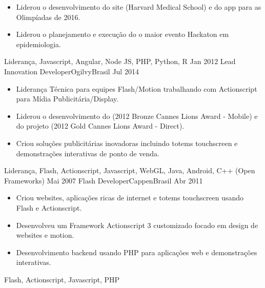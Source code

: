 \begin{experiences}
{\begin{itemize}
                        \item Liderou o desenvolvimento do site  (Harvard Medical School) e do app  para as Olimpíadas de 2016.
                        \item Liderou o planejamento e execução do  o maior evento Hackaton em epidemiologia.
                      \end{itemize}
                    }
                    {Liderança, Javascript, Angular, Node JS, PHP, Python, R}
  \emptySeparator
  \experience
    {Jan 2012}     {Lead Innovation Developer}{Ogilvy}{Brasil}
    {Jul 2014}    {
                      \begin{itemize}
                        \item Liderança Técnica para equipes Flash/Motion trabalhando com Actionscript para Mídia Publicitária/Display.
                        \item Liderou o desenvolvimento do  (2012 Bronze Cannes Lions Award - Mobile) e do projeto  (2012 Gold Cannes Lions Award - Direct).
                        \item Criou soluções publicitárias inovadoras incluindo totems touchscreen e demonstrações interativas de ponto de venda.
                      \end{itemize}
                    }
                    {Liderança, Flash, Actionscript, Javascript, WebGL, Java, Android, C++ (Open Frameworks)}
  \emptySeparator
  \experience
    {Mai 2007}     {Flash Developer}{Cappen}{Brasil}
    {Abr 2011}    {
                      \begin{itemize}
                        \item Criou websites, aplicações ricas de internet e totems touchscreen usando Flash e Actionscript.
                        \item Desenvolveu um Framework Actionscript 3 customizado focado em design de websites e motion.
                        \item Desenvolvimento backend usando PHP para aplicações web e demonstrações interativas.
                      \end{itemize}
                    }
                    {Flash, Actionscript, Javascript, PHP}
  \emptySeparator
\end{experiences}
